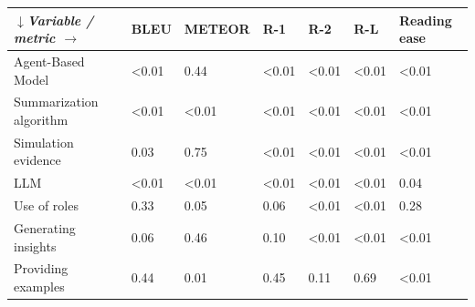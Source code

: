 \begin{tabular}{|l|l|l|l|l|l|l|}
\hline
\textit{$\downarrow$Variable / metric $\rightarrow$} & BLEU & METEOR & R-1 & R-2 & R-L & Reading ease \\
 \hline
 Agent-Based Model & \textless{}0.01 & 0.44 & \textless{}0.01 & \textless{}0.01 & \textless{}0.01 & \textless{}0.01 \\
 \hline
 Summarization algorithm & \textless{}0.01 & \textless{}0.01 & \textless{}0.01 & \textless{}0.01 & \textless{}0.01 & \textless{}0.01 \\
 \hline
 Simulation evidence & 0.03 & 0.75 & \textless{}0.01 & \textless{}0.01 & \textless{}0.01 & \textless{}0.01 \\
 \hline
 LLM & \textless{}0.01 & \textless{}0.01 & \textless{}0.01 & \textless{}0.01 & \textless{}0.01 & 0.04 \\
 \hline
 Use of roles & 0.33 & 0.05 & 0.06 & \textless{}0.01 & \textless{}0.01 & 0.28 \\
 \hline
 Generating insights & 0.06 & 0.46 & 0.10 & \textless{}0.01 & \textless{}0.01 & \textless{}0.01 \\
 \hline
 Providing examples & 0.44 & 0.01 & 0.45 & 0.11 & 0.69 & \textless{}0.01 \\
\hline
\end{tabular}
